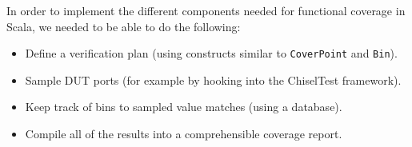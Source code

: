 \documentclass[conference]{IEEEtran}
\begin{document}
%
%
%

In order to implement the different components needed for functional coverage in Scala, we needed to be able to do the following:

\begin{itemize}
  \item Define a verification plan (using constructs similar to \texttt{CoverPoint} and \texttt{Bin}).
  \item Sample DUT ports (for example by hooking into the ChiselTest framework).
  \item Keep track of bins to sampled value matches (using a database).
  \item Compile all of the results into a comprehensible coverage report.
\end{itemize}
\end{document}
